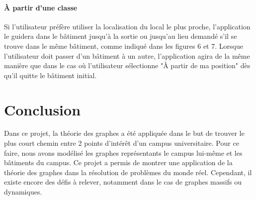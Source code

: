 \documentclass[journal, a4paper]{IEEEtran}
\begin{document}
\paragraph{À partir d'une classe}
Si l'utilisateur préfère utiliser la localisation du local le plus proche, l'application le guidera dans le bâtiment jusqu'à la sortie ou jusqu'au lieu demandé s'il se trouve dans le même bâtiment, comme indiqué dans les figures 6 et 7. Lorsque l'utilisateur doit passer d'un bâtiment à un autre, l'application agira de la même manière que dans le cas où l'utilisateur sélectionne "À partir de ma position" dès qu'il quitte le bâtiment initial.
\section{Conclusion}
Dans ce projet, la théorie des graphes a été appliquée dans le but de trouver le plus court chemin entre 2 points d'intérêt d'un campus universitaire.
Pour ce faire, nous avons modélisé les graphes représentants le campus lui-même et les bâtiments du campus. Ce projet a permis de montrer une application de la théorie des graphes dans la résolution de problèmes du monde réel.
Cependant, il existe encore des défis à relever, notamment dans le cas de graphes massifs ou dynamiques.






		



\end{document}
